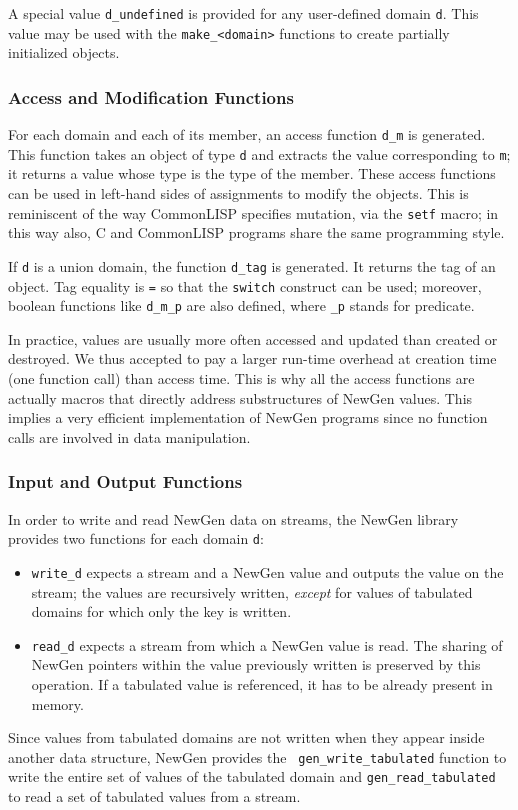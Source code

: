 A special value {\tt d\_undefined} is provided for any user-defined
domain {\tt d}.  This value may be used with the {\tt make\_<domain>}
functions to create partially initialized objects.

\subsubsection*{Access and Modification Functions}
For each domain and each of its member, an access function {\tt d\_m} is
generated. This function takes an object of type {\tt d} and extracts
the value corresponding to {\tt m}; it returns a value whose type is the
type of the member. These access functions can be used in left-hand
sides of assignments to modify the objects. This is reminiscent of the
way CommonLISP specifies mutation, via the {\tt setf} macro; in this way
also, C and CommonLISP programs share the same programming style.

If {\tt d} is a union domain, the function {\tt d\_tag} is generated.
It returns the tag of an object.  Tag equality is {\tt =} so that the
{\tt switch} construct can be used; moreover, boolean functions like
{\tt d\_m\_p} are also defined, where {\tt \_p} stands for predicate.

In practice, values are usually more often accessed and updated than
created or destroyed. We thus accepted to pay a larger run-time overhead
at creation time (one function call) than access time. This is why all
the access functions are actually macros that directly address
substructures of NewGen values. This implies a very efficient
implementation of NewGen programs since no function calls are involved
in data manipulation.

\subsubsection*{Input and Output Functions}
In order to write and read NewGen data on streams, the NewGen library
provides two functions for each domain {\tt d}:
\begin{itemize}
\item
        {\tt write\_d} expects a stream and a NewGen value and outputs
the value on the stream; the values are recursively written, {\em
except} for values of tabulated domains for which only the key is
written.
\item
        {\tt read\_d} expects a stream from which a NewGen value is
read. The sharing of NewGen pointers within the value previously written
is preserved by this operation. If a tabulated value is referenced, it
has to be already present in memory.
\end{itemize}
Since values from tabulated domains are not written when they appear
inside another data structure, NewGen provides the {\tt
gen\_write\_tabulated} function to write the entire set of values of the
tabulated domain and {\tt gen\_read\_tabulated} to read a set of
tabulated values from a stream.

